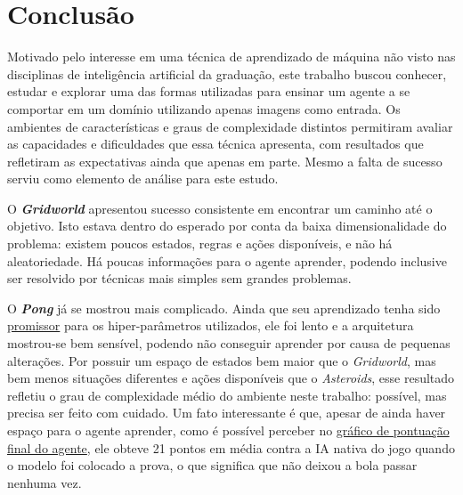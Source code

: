 
\chapter{Conclusão}
\label{cap:conclusoes}

Motivado pelo interesse em uma técnica de aprendizado de máquina não visto nas disciplinas de inteligência artificial da graduação, este trabalho buscou conhecer, estudar e explorar uma das formas utilizadas para ensinar um agente a se comportar em um domínio utilizando apenas imagens como entrada.
Os ambientes de características e graus de complexidade distintos permitiram avaliar as capacidades e dificuldades que essa técnica apresenta, com resultados que refletiram as expectativas ainda que apenas em parte.
Mesmo a falta de sucesso serviu como elemento de análise para este estudo.

O \textbf{\textit{Gridworld}} apresentou sucesso consistente em encontrar um caminho até o objetivo.
Isto estava dentro do esperado por conta da baixa dimensionalidade do problema:
existem poucos estados, regras e ações disponíveis, e não há aleatoriedade.
Há poucas informações para o agente aprender, podendo inclusive ser resolvido por técnicas mais simples sem grandes problemas.

O \textbf{\textit{Pong}} já se mostrou mais complicado.
Ainda que seu aprendizado tenha sido \hyperref[fig:pong_score]{promissor} para os hiper-parâmetros utilizados, ele foi lento e a arquitetura mostrou-se bem sensível, podendo não conseguir aprender por causa de pequenas alterações.
Por possuir um espaço de estados bem maior que o \textit{Gridworld}, mas bem menos situações diferentes e ações disponíveis que o \textit{Asteroids}, esse resultado refletiu o grau de complexidade médio do ambiente neste trabalho: possível, mas precisa ser feito com cuidado.
Um fato interessante é que, apesar de ainda haver espaço para o agente aprender, como é possível perceber no \hyperref[fig:pong_score]{gráfico de pontuação final do agente}, ele obteve 21 pontos em média contra a IA nativa do jogo quando o modelo foi colocado a prova, o que significa que não deixou a bola passar nenhuma vez.

